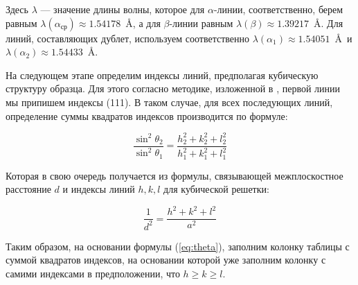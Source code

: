 \documentclass[a4paper, 12pt]{article}
\begin{document}
Здесь $\lambda$ --- значение длины волны, которое для $\alpha$-линии, соответственно, берем равным $\lambda(\alpha_\text{ср}) \approx 1.54178$~\AA, а для $\beta$-линии равным $\lambda(\beta) \approx 1.39217$~\AA. Для линий, составляющих дублет, используем соответственно $\lambda(\alpha_1) \approx 1.54051$~\AA~и $\lambda(\alpha_2) \approx 1.54433$~\AA.

На следующем этапе определим индексы линий, предполагая кубическую структуру образца. Для этого согласно методике, изложенной в \cite{Practicum}, первой линии мы припишем индексы (111). В таком случае, для всех последующих линий, определение суммы квадратов индексов производится по формуле:

\begin{equation}
	\frac{\sin^2\theta_2}{\sin^2\theta_1} = \frac{h_2^2 + k_2^2 + l_2^2}{h_1^2 + k_1^2 + l_1^2}
	\label{eq:theta}
\end{equation}

Которая в свою очередь получается из формулы, связывающей межплоскостное расстояние $d$ и индексы линий $h, k, l$ для кубической решетки:

\begin{equation}
	\frac{1}{d^2} = \frac{h^2 + k^2 + l^2}{a^2}
\end{equation}

Таким образом, на основании формулы (\ref{eq:theta}), заполним колонку таблицы с суммой квадратов индексов, на основании которой уже заполним колонку с самими индексами в предположении, что $h \ge k \ge l$.
\end{document}

